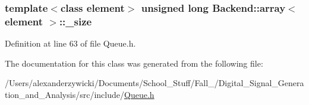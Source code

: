 \hypertarget{class_backend_1_1array_ae51d64e87b42931946111c28b98e8a18}{
\subsubsection[{\+\_\+size}]{\setlength{\rightskip}{0pt plus 5cm}template$<$class element$>$ unsigned long {\bf Backend\+::array}$<$ element $>$\+::\+\_\+size\hspace{0.3cm}{\ttfamily [protected]}}}\label{class_backend_1_1array_ae51d64e87b42931946111c28b98e8a18}


Definition at line 63 of file Queue.\+h.



The documentation for this class was generated from the following file\+:\begin{DoxyCompactItemize}
\item 
/\+Users/alexanderzywicki/\+Documents/\+School\+\_\+\+Stuff/\+Fall\+\_/\+Digital\+\_\+\+Signal\+\_\+\+Generation\+\_\+and\+\_\+\+Analysis/src/include/\hyperlink{_queue_8h}{Queue.\+h}\end{DoxyCompactItemize}
